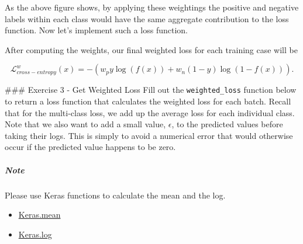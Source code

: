 \documentclass[11pt]{article}
\providecommand{\tightlist}{%
      \setlength{\itemsep}{0pt}\setlength{\parskip}{0pt}}
\begin{document}
    As the above figure shows, by applying these weightings the positive and
negative labels within each class would have the same aggregate
contribution to the loss function. Now let's implement such a loss
function.

After computing the weights, our final weighted loss for each training
case will be

\[\mathcal{L}_{cross-entropy}^{w}(x) = - (w_{p} y \log(f(x)) + w_{n}(1-y) \log( 1 - f(x) ) ).\]

     \#\#\# Exercise 3 - Get Weighted Loss Fill out the
\texttt{weighted\_loss} function below to return a loss function that
calculates the weighted loss for each batch. Recall that for the
multi-class loss, we add up the average loss for each individual class.
Note that we also want to add a small value, \(\epsilon\), to the
predicted values before taking their logs. This is simply to avoid a
numerical error that would otherwise occur if the predicted value
happens to be zero.

\hypertarget{note}{%
\subparagraph{Note}\label{note}}

Please use Keras functions to calculate the mean and the log.

\begin{itemize}
\tightlist
\item
  \href{https://www.tensorflow.org/versions/r1.15/api_docs/python/tf/keras/backend/mean}{Keras.mean}
\item
  \href{https://www.tensorflow.org/versions/r1.15/api_docs/python/tf/keras/backend/log}{Keras.log}
\end{itemize}
\end{document}
